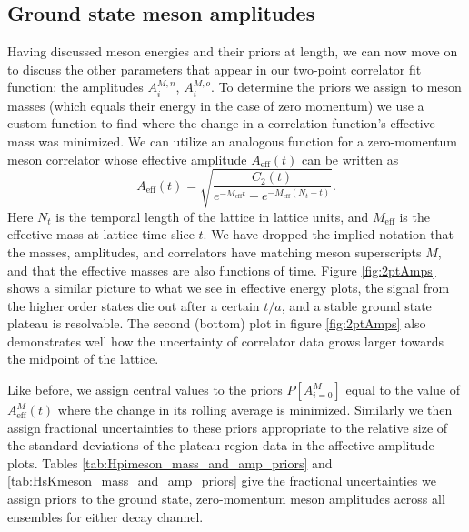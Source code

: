 \subsection{Ground state meson amplitudes}\label{sec:2pt_amps_ground_state}
Having discussed meson energies and their priors at length, we can now move on to discuss the other parameters that appear in our two-point correlator fit function: the amplitudes $A_i^{M,n}$, $A_i^{M,o}$. To determine the priors we assign to meson masses (which equals their energy in the case of zero momentum) we use a custom function to find where the change in a correlation function's effective mass was minimized.  We can utilize an analogous function for a zero-momentum meson correlator whose effective amplitude $A_\mathrm{eff}(t)$ can be written as
 \begin{equation}\label{eq:2ptaeff}
    A_{\mathrm{eff}}(t) = \sqrt{\frac{C_2(t)}{e^{-M_{\mathrm{eff}}t}+e^{-M_{\mathrm{eff}}(N_t-t)}}}.
\end{equation}
Here $N_t$ is the temporal length of the lattice in lattice units, and $M_\mathrm{eff}$ is the effective mass at lattice time slice $t$.  We have dropped the implied notation that the masses, amplitudes, and correlators have matching meson superscripts $M$, and that the effective masses are also functions of time. Figure \ref{fig:2ptAmps} shows a similar picture to what we see in effective energy plots, the signal from the higher order states die out after a certain $t/a$, and a stable ground state plateau is resolvable.  The second (bottom) plot in figure \ref{fig:2ptAmps} also  demonstrates well how the uncertainty of correlator data grows larger towards the midpoint of the lattice.

Like before, we assign central values to the priors $P[A^M_{i=0}]$ equal to the value of $A^M_\mathrm{eff}(t)$ where the change in its rolling average is minimized.  Similarly we then assign fractional uncertainties to these priors appropriate to the relative size of the standard deviations of the plateau-region data in the affective amplitude plots.  Tables \ref{tab:Hpimeson_mass_and_amp_priors} and \ref{tab:HsKmeson_mass_and_amp_priors} give the fractional uncertainties we assign priors to the ground state, zero-momentum meson amplitudes across all ensembles for either decay channel. 

